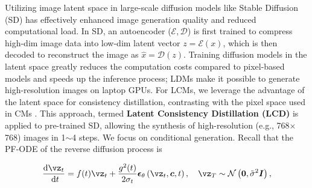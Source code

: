 \documentclass{article} %
\begin{document}
Utilizing image latent space in large-scale diffusion models like Stable Diffusion (SD) \citep{rombach2022high} has effectively enhanced image generation quality and reduced computational load. In SD, an autoencoder ($\mathcal{E}, \mathcal{D}$) is first trained to compress high-dim image data into low-dim latent vector $z=\mathcal{E}(x)$, which is then decoded to reconstruct the image as $\hat{x}=\mathcal{D}(z)$. Training diffusion models in the latent space greatly reduces the computation costs compared to pixel-based models and speeds up the inference process; LDMs make it possible to generate high-resolution images on laptop GPUs.
For LCMs, we leverage the advantage of the latent space for consistency distillation, contrasting with the pixel space used in CMs \citep{song2023consistency}. This approach, termed \textbf{Latent Consistency Distillation (LCD)} is applied to pre-trained SD, allowing the synthesis of high-resolution (e.g., 768$\times$768) images in 1$\sim$4 steps.
We focus on conditional generation. Recall that the PF-ODE of the reverse diffusion process \citep{song2020score, lu2022dpm} is
\begin{small}
\begin{equation}
    \frac{\mathrm{d} \boldsymbol{\vz}_t}{\mathrm{~d} t}= f(t) \boldsymbol{\vz}_t+\frac{g^2(t)}{2 \sigma_t} \boldsymbol{\epsilon}_\theta\left(\boldsymbol{\vz}_t, \boldsymbol{c}, t\right), \quad \boldsymbol{\vz}_T \sim \mathcal{N}\left(\mathbf{0}, \tilde{\sigma}^2 \boldsymbol{I}\right),
    \label{eq:pf_ode_vanilla}
\end{equation}
\end{small}
\end{document}
